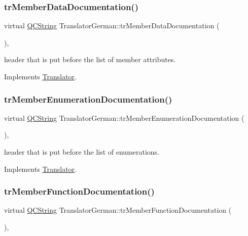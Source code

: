 \subsubsection{\texorpdfstring{trMemberDataDocumentation()}{trMemberDataDocumentation()}}
{\footnotesize\ttfamily virtual \mbox{\hyperlink{class_q_c_string}{Q\+C\+String}} Translator\+German\+::tr\+Member\+Data\+Documentation (\begin{DoxyParamCaption}{ }\end{DoxyParamCaption})\hspace{0.3cm}{\ttfamily [inline]}, {\ttfamily [virtual]}}

header that is put before the list of member attributes. 

Implements \mbox{\hyperlink{class_translator}{Translator}}.

\mbox{\label{class_translator_german_a64f889f877aad2c863138912d87a52fa}} 
\subsubsection{\texorpdfstring{trMemberEnumerationDocumentation()}{trMemberEnumerationDocumentation()}}
{\footnotesize\ttfamily virtual \mbox{\hyperlink{class_q_c_string}{Q\+C\+String}} Translator\+German\+::tr\+Member\+Enumeration\+Documentation (\begin{DoxyParamCaption}{ }\end{DoxyParamCaption})\hspace{0.3cm}{\ttfamily [inline]}, {\ttfamily [virtual]}}

header that is put before the list of enumerations. 

Implements \mbox{\hyperlink{class_translator}{Translator}}.

\mbox{\label{class_translator_german_a63ff288a3dd57ab9207f772ad70d5269}} 
\subsubsection{\texorpdfstring{trMemberFunctionDocumentation()}{trMemberFunctionDocumentation()}}
{\footnotesize\ttfamily virtual \mbox{\hyperlink{class_q_c_string}{Q\+C\+String}} Translator\+German\+::tr\+Member\+Function\+Documentation (\begin{DoxyParamCaption}{ }\end{DoxyParamCaption})\hspace{0.3cm}{\ttfamily [inline]}, {\ttfamily [virtual]}}

